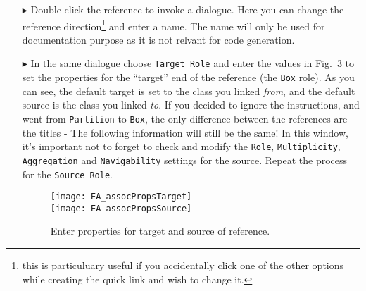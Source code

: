 \begin{enumerate}
\begin{figure}[htbp]
	\centering
  \texttt{[image: EA\_quickLink]}
	\caption{Quick Link is a central gesture in EA.}
	\label{fig:quicklink}
\end{figure}
\FloatBarrier

Now click on the black arrow and pull to another element you wish to ``quick link" to.
In this case quick link from \texttt{Box} to \texttt{Partition}.
In the context-menu that pops-up, choose \texttt{Create Bidirectional EReference} (Fig.~\ref{fig:ereference}).

\begin{figure}[htbp]
	\centering
  \texttt{[image: EA\_ereferenceBidirectional]}
	\caption{Create a reference via Quick Link.}
	\label{fig:ereference}
\end{figure}
\FloatBarrier

\item[$\blacktriangleright$] Double click the reference to invoke a dialogue. %
Here you can change the reference direction\footnote{this is particuluary useful if you accidentally click one of the other options while creating the quick link and wish to change it.} and enter a name. The name will only be used for documentation purpose as it is not relvant for code generation.


\item[$\blacktriangleright$] In the same dialogue choose \texttt{Target Role} and enter the values in Fig.~\ref{fig:reference_ends} to set the properties for the ``target'' end of the reference (the \texttt{Box} role). As you can see, the default target is set to the class you linked \emph{from}, and the default source is the class you linked \emph{to}. If you decided to ignore the instructions, and went from \texttt{Partition} to \texttt{Box}, the only difference between the references are the titles - The following information will still be the same! In this window, it's important not to forget to check and modify the \texttt{Role}, \texttt{Multiplicity}, \texttt{Aggregation} and \texttt{Navigability} settings for the source.  Repeat the process for the \texttt{Source Role}.

\begin{figure}[htbp]
	\centering
	  \texttt{[image: EA\_assocPropsTarget]}\\
  \vspace{0.5cm}
    \texttt{[image: EA\_assocPropsSource]}
	\caption{Enter properties for target and source of reference.}
	\label{fig:reference_ends}
\end{figure}
\FloatBarrier
\end{enumerate}

